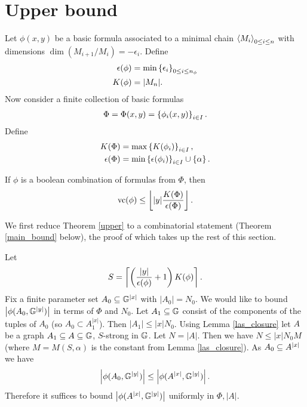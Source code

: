 \section{Upper bound}
Let $\phi(x,y)$ be a basic formula associated to a minimal chain  $\left\langle M_i \right\rangle_{0 \leq i \leq n}$ with dimensions  $\dim(M_{i+1}/M_i) = -\epsilon_i$.
Define
\begin{align*}
  \epsilon(\phi) &= \min \left\{\epsilon_i\right\}_{0 \leq i \leq n_\phi}\\
  K(\phi) &= |M_{n}|.
\end{align*}
Now consider a finite collection of basic formulas
\begin{align*}
  \Phi = \Phi( x, y) = \left\{\phi_i( x,  y)\right\}_{i\in I}.
\end{align*}
Define
\begin{align*}
  K(\Phi) &= \max \left\{K(\phi_i)\right\}_{i \in I}, \\
  \epsilon(\Phi) &= \min \left\{\epsilon(\phi_i)\right\}_{i \in I} \cup \left\{\alpha\right\}.
\end{align*}
\begin{Theorem} \label{upper}
  If $\phi$ is a boolean combination of formulas from $\Phi$, then
  \begin{align*}
    \operatorname{vc}(\phi) \leq \left \lfloor |y|\frac{K(\Phi)}{\epsilon(\Phi)} \right \rfloor.    
  \end{align*}
\end{Theorem}
We first reduce Theorem \ref{upper} to a combinatorial statement (Theorem \ref{main_bound} below), the proof of which
takes up the rest of this section.

Let
\begin{align*}
  S = \left\lceil{\left(\frac{|y|}{\epsilon(\phi)} + 1\right) K(\phi)}\right\rceil.
\end{align*}
Fix a finite parameter set $A_0 \subseteq \mathbb G^{|x|}$ with $|A_0| = N_0$.
We would like to bound $\left|\phi(A_0, \mathbb G^{|y|})\right|$ in terms of $\Phi$ and $N_0$.
Let $A_1 \subseteq \mathbb G$ consist of the components of the tuples of $A_0$ (so $A_0 \subset A_1^{|x|}$).
Then $|A_1| \leq |x| N_0$.
Using Lemma \ref{las_closure} let $A$ be a graph $A_1 \subseteq A \subseteq \mathbb G$, $S$-strong in $\mathbb G$.
Let $N = |A|$.
Then we have $N \leq |x| N_0 M$ (where $M = M(S, \alpha)$ is the constant from Lemma \ref{las_closure}).
As $A_0 \subseteq A^{|x|}$ we have
\begin{align*}
  \left|\phi(A_0, \mathbb G^{|y|})\right| \leq \left|\phi(A^{|x|}, \mathbb G^{|y|})\right|.
\end{align*}
Therefore it suffices to bound $\left|\phi(A^{|x|}, \mathbb G^{|y|})\right|$ uniformly in $\Phi, |A|$.

